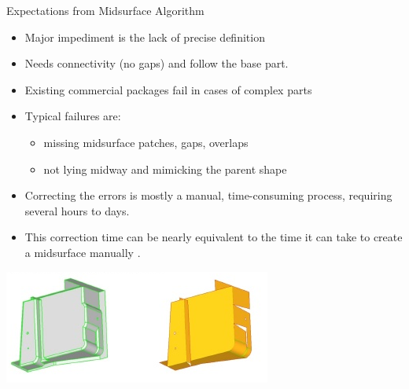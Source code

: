\begin{frame}{Expectations from Midsurface Algorithm}
\begin{itemize}[noitemsep,label=\textbullet,topsep=2pt,parsep=2pt,partopsep=2pt]
\item Major impediment is the lack of precise definition \cite{Ramanathan2004}
\item Needs connectivity (no gaps) and follow the base part.
\item Existing commercial packages fail in cases of complex parts %
\item Typical failures are: 
	\begin{itemize}[noitemsep,label=\textbullet,topsep=2pt,parsep=2pt,partopsep=2pt]
	\item missing midsurface patches, gaps, overlaps
	\item not lying midway and mimicking the parent shape
\end{itemize}
\item Correcting the errors is mostly a manual, time-consuming process, requiring several hours to days. 
\item This correction time can be nearly equivalent to the time it can take to create a midsurface manually \cite{Stolt2006}. 
\end{itemize}
\begin{center}
\includegraphics[width=0.5\linewidth]{../Common/images/MidsurfaceGaps}
\end{center}
\end{frame}



